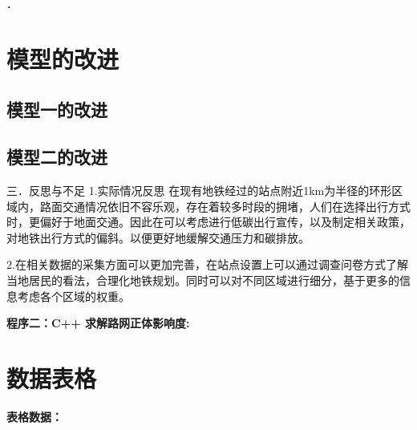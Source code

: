 \documentclass[12pt,a4paper]{mcmthesis}
\begin{document}
．

\section{模型的改进}

\subsection{模型一的改进}


\subsection{模型二的改进}
三．反思与不足
1.实际情况反思
在现有地铁经过的站点附近1km为半径的环形区域内，路面交通情况依旧不容乐观，存在着较多时段的拥堵，人们在选择出行方式时，更偏好于地面交通。因此在可以考虑进行低碳出行宣传，以及制定相关政策，对地铁出行方式的偏斜。以便更好地缓解交通压力和碳排放。

2.在相关数据的采集方面可以更加完善，在站点设置上可以通过调查问卷方式了解当地居民的看法，合理化地铁规划。同时可以对不同区域进行细分，基于更多的信息考虑各个区域的权重。

    \textcolor[rgb]{0.98,0.00,0.00}{\textbf{程序二：C++ 求解路网正体影响度:}}
    

    \newpage
    \setcounter{table}{0}
    \section*{数据表格}
    \textcolor[rgb]{0.98,0.00,0.00}{\textbf{表格数据：}}
    
\end{document}
